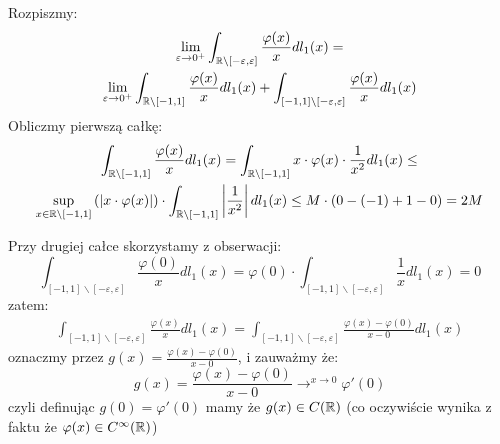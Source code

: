 \documentclass[11pt]{scrartcl}
\begin{document}
    \begin{walk}
        \item Rozpiszmy:
            \begin{gather*}
                \lim_{\varepsilon \to 0^+} \int_{\mathbb R \backslash [-\varepsilon, \varepsilon]} 
                    \frac{\varphi (x)}{x} dl_1 (x) = \\
                \lim_{\varepsilon \to 0^+} 
                    \int_{\mathbb R \backslash [-1,1]} \frac{\varphi (x)}{x} dl_1 (x) +
                    \int_{[-1,1] \backslash [-\varepsilon, \varepsilon]} \frac{\varphi (x)}{x} dl_1 (x)
            \end{gather*}
            Obliczmy pierwszą całkę:
            \begin{gather*}
                \int_{\mathbb R \backslash [-1,1]} \frac{\varphi (x)}{x} dl_1 (x) = 
                \int_{\mathbb R \backslash [-1,1]} x \cdot \varphi (x) \cdot \frac{1}{x^2} dl_1(x) \leq \\
                \sup_{x \in \mathbb R \backslash [-1, 1]} \left ( \left\lvert x \cdot \varphi (x) \right\rvert \right ) \cdot  
                    \int_{\mathbb R \backslash [-1,1]} \left\lvert \frac{1}{x^2} \right\rvert dl_1 (x) \leq
                M \cdot (0 - (-1) + 1 - 0) = 2M
            \end{gather*}
            
            Przy drugiej całce skorzystamy z obserwacji:
            \[
                \int_{[-1,1] \backslash [-\varepsilon, \varepsilon]} \frac{\varphi (0)}{x} dl_1 (x) =
                \varphi (0) \cdot \int_{[-1,1] \backslash [-\varepsilon, \varepsilon]} \frac{1}{x} dl_1 (x) = 0 
            \]
            zatem:
            \begin{gather*}
                \int_{[-1,1] \backslash [-\varepsilon, \varepsilon]} \frac{\varphi (x)}{x} dl_1 (x) =
                \int_{[-1,1] \backslash [-\varepsilon, \varepsilon]} 
                    \frac{\varphi (x) - \varphi (0)}{x - 0} dl_1 (x)
            \end{gather*}
            oznaczmy przez $g(x) = \frac{\varphi (x) - \varphi (0)}{x - 0}$, i zauważmy że:
            \[
                g(x) = \frac{\varphi (x) - \varphi (0)}{x - 0} \to^{x \to 0} \varphi' (0)
            \]
            czyli definując $g(0) = \varphi' (0)$ mamy że $g(x) \in C (\mathbb R)$ 
            (co oczywiście wynika z faktu że $\varphi (x) \in C^{\infty }(\mathbb R)$)


\end{walk}
\end{document}

